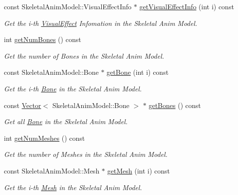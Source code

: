 \begin{DoxyCompactItemize}
const Skeletal\+Anim\+Model\+::\+Visual\+Effect\+Info $\ast$ \hyperlink{class_magnum_1_1endif_1_1_resource_a07b6fa9283355f92fabbc16005ab52b9}{get\+Visual\+Effect\+Info} (int i) const 
\begin{DoxyCompactList}\small\item\em Get the i-\/th \hyperlink{class_magnum_1_1_visual_effect}{Visual\+Effect} Infomation in the Skeletal Anim Model. \end{DoxyCompactList}\item 
int \hyperlink{class_magnum_1_1endif_1_1_resource_aafb7c7db246a9635dd2f474d541933b7}{get\+Num\+Bones} () const 
\begin{DoxyCompactList}\small\item\em Get the number of Bones in the Skeletal Anim Model. \end{DoxyCompactList}\item 
const Skeletal\+Anim\+Model\+::\+Bone $\ast$ \hyperlink{class_magnum_1_1endif_1_1_resource_acf6da5d4bf8ed2056c9d49a0049d003c}{get\+Bone} (int i) const 
\begin{DoxyCompactList}\small\item\em Get the i-\/th \hyperlink{class_magnum_1_1endif_1_1_bone}{Bone} in the Skeletal Anim Model. \end{DoxyCompactList}\item 
const \hyperlink{class_magnum_1_1_vector}{Vector}$<$ Skeletal\+Anim\+Model\+::\+Bone $>$ $\ast$ \hyperlink{class_magnum_1_1endif_1_1_resource_a3509d26845f8f6fb6530bbc075cec24c}{get\+Bones} () const 
\begin{DoxyCompactList}\small\item\em Get all \hyperlink{class_magnum_1_1endif_1_1_bone}{Bone} in the Skeletal Anim Model. \end{DoxyCompactList}\item 
int \hyperlink{class_magnum_1_1endif_1_1_resource_a5bd8d92000910009c698a73abdb3b137}{get\+Num\+Meshes} () const 
\begin{DoxyCompactList}\small\item\em Get the number of Meshes in the Skeletal Anim Model. \end{DoxyCompactList}\item 
const Skeletal\+Anim\+Model\+::\+Mesh $\ast$ \hyperlink{class_magnum_1_1endif_1_1_resource_ace32bee4f6dc20cba405df3eefd5e57a}{get\+Mesh} (int i) const 
\begin{DoxyCompactList}\small\item\em Get the i-\/th \hyperlink{class_magnum_1_1endif_1_1_mesh}{Mesh} in the Skeletal Anim Model. \end{DoxyCompactList}\item 

\end{DoxyCompactItemize}
